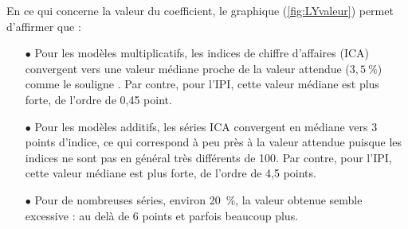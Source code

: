\documentclass[12pt, a4paper, french]{article}
\begin{document}
En ce qui concerne la valeur du coefficient, le graphique (\ref{fig:LYvaleur}) permet d'affirmer que :
\begin{itemize}
	\item[$\bullet$] Pour les modèles multiplicatifs, les indices de chiffre d'affaires (ICA) convergent vers une valeur médiane proche de la valeur attendue ($3,5~\%$) comme le souligne \cite{B1992}. Par contre, pour l'IPI, cette valeur médiane est plus forte, de l'ordre de 0,45 point.
	\item[$\bullet$] Pour les modèles additifs, les séries ICA convergent en médiane vers 3 points d'indice, ce qui correspond à peu près à la valeur attendue puisque les indices ne sont pas en général très différents de 100. Par contre, pour l'IPI, cette valeur médiane est plus forte, de l'ordre de 4,5 points.
	\item[$\bullet$] Pour de nombreuses séries, environ 20~\%, la valeur obtenue semble excessive : au delà de 6 points et parfois beaucoup plus.
\end{itemize}
\end{document}
